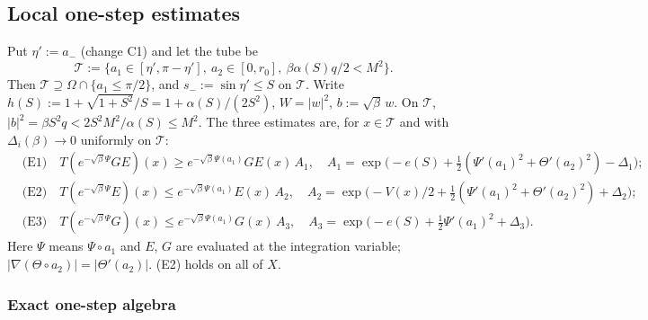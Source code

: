 \subsection{Local one-step estimates}

Put $\eta':=a_-$ (change C1) and let the tube be
\[
\mathcal T:=\{a_1\in[\eta',\pi-\eta'],\ a_2\in[0,r_0],\ \beta\alpha(S)q/2<M^2\}.
\]
Then $\mathcal T\supseteq\Omega\cap\{a_1\le\pi/2\}$, and $s_-:=\sin\eta'\le S$ on $\mathcal T$. Write
$h(S):=1+\sqrt{1+S^2}/S=1+\alpha(S)/(2S^2)$, $W=|w|^2$, $b:=\sqrt\beta\,w$. On $\mathcal T$,
$|b|^2=\beta S^2q<2S^2M^2/\alpha(S)\le M^2$. The three estimates are, for $x\in\mathcal T$ and with
$\Delta_i(\beta)\to0$ uniformly on $\mathcal T$:
\begin{align*}
&\text{(E1)}\quad T(e^{-\sqrt\beta\Psi}GE)(x)\ge e^{-\sqrt\beta\Psi(a_1)}GE(x)\,A_1,\quad
A_1=\exp\big(-e(S)+\tfrac12(\Psi'(a_1)^2+\Theta'(a_2)^2)-\Delta_1\big);\\
&\text{(E2)}\quad T(e^{-\sqrt\beta\Psi}E)(x)\le e^{-\sqrt\beta\Psi(a_1)}E(x)\,A_2,\quad
A_2=\exp\big(-V(x)/2+\tfrac12(\Psi'(a_1)^2+\Theta'(a_2)^2)+\Delta_2\big);\\
&\text{(E3)}\quad T(e^{-\sqrt\beta\Psi}G)(x)\le e^{-\sqrt\beta\Psi(a_1)}G(x)\,A_3,\quad
A_3=\exp\big(-e(S)+\tfrac12\Psi'(a_1)^2+\Delta_3\big).
\end{align*}
Here $\Psi$ means $\Psi\circ a_1$ and $E$, $G$ are evaluated at the integration variable; $|\nabla(\Theta\circ a_2)|=|\Theta'(a_2)|$.
(E2) holds on all of $X$.

\subsubsection*{Exact one-step algebra}

